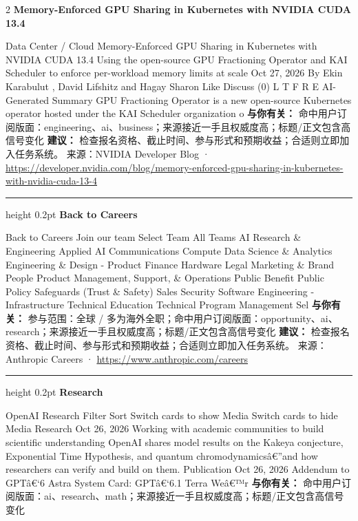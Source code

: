 \documentclass[10.5pt]{ctexart}
\begin{document}
\begin{multicols}{2}
{\large\bfseries Memory-Enforced GPU Sharing in Kubernetes with NVIDIA CUDA 13.4}\par
Data Center / Cloud Memory-Enforced GPU Sharing in Kubernetes with NVIDIA CUDA 13.4 Using the open-source GPU Fractioning Operator and KAI Scheduler to enforce per-workload memory limits at scale Oct 27, 2026 By Ekin Karabulut , David Lifshitz and Hagay Sharon Like Discuss (0) L T F R E AI-Generated Summary GPU Fractioning Operator is a new open-source Kubernetes operator hosted under the KAI Scheduler organization o
\textbf{与你有关：} 命中用户订阅版面：engineering、ai、business；来源接近一手且权威度高；标题/正文包含高信号变化
\textbf{建议：} 检查报名资格、截止时间、参与形式和预期收益；合适则立即加入任务系统。
{\footnotesize\color{ormuted} 来源：NVIDIA Developer Blog · \url{https://developer.nvidia.com/blog/memory-enforced-gpu-sharing-in-kubernetes-with-nvidia-cuda-13-4}}
\vspace{2mm}
\hrule height 0.2pt
\vspace{2mm}
{\large\bfseries Back to Careers}\par
Back to Careers Join our team Select Team All Teams AI Research \& Engineering Applied AI Communications Compute Data Science \& Analytics Engineering \& Design - Product Finance Hardware Legal Marketing \& Brand People Product Management, Support, \& Operations Public Benefit Public Policy Safeguards (Trust \& Safety) Sales Security Software Engineering - Infrastructure Technical Education Technical Program Management Sel
\textbf{与你有关：} 参与范围：全球 / 多为海外全职；命中用户订阅版面：opportunity、ai、research；来源接近一手且权威度高；标题/正文包含高信号变化
\textbf{建议：} 检查报名资格、截止时间、参与形式和预期收益；合适则立即加入任务系统。
{\footnotesize\color{ormuted} 来源：Anthropic Careers · \url{https://www.anthropic.com/careers}}
\vspace{2mm}
\hrule height 0.2pt
\vspace{2mm}
{\large\bfseries Research}\par
OpenAI Research Filter Sort Switch cards to show Media Switch cards to hide Media Research Oct 26, 2026 Working with academic communities to build scientific understanding OpenAI shares model results on the Kakeya conjecture, Exponential Time Hypothesis, and quantum chromodynamicsâ€”and how researchers can verify and build on them. Publication Oct 26, 2026 Addendum to GPTâ€‘6 Astra System Card: GPTâ€‘6.1 Terra Weâ€™r
\textbf{与你有关：} 命中用户订阅版面：ai、research、math；来源接近一手且权威度高；标题/正文包含高信号变化

\end{multicols}
\end{document}
